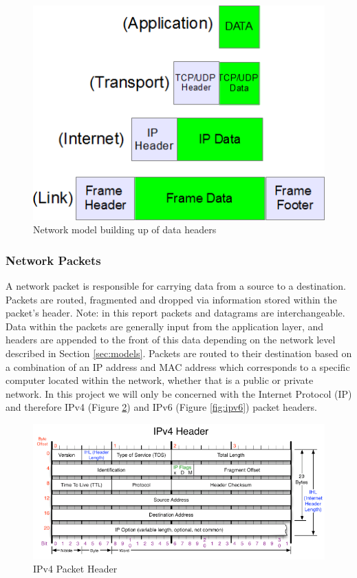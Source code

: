 \documentclass[final_report.tex]{subfiles}
\begin{document}
\begin{figure}[H]
	\centering
	\includegraphics[width=\textwidth]{img/headers.png}
	\caption{Network model building up of data headers}
	\label{fig:headers}
\end{figure}

\subsubsection{Network Packets}
A network packet is responsible for carrying data from a source to a destination. Packets are routed, fragmented and dropped via information stored within the packet's header. Note: in this report packets and datagrams are interchangeable. Data within the packets are generally input from the application layer, and headers are appended to the front of this data depending on the network level described in Section \ref{sec:models}. Packets are routed to their destination based on a combination of an IP address and MAC address which corresponds to a specific computer located within the network, whether that is a public or private network. In this project we will only be concerned with the Internet Protocol (IP) and therefore IPv4 (Figure \ref{fig:ipv4}) and IPv6 (Figure \ref{fig:ipv6}) packet headers.

\begin{figure}[H]
	\centering
	\includegraphics[width=\textwidth]{img/ipv4header.png}
	\caption{IPv4 Packet Header}
	\label{fig:ipv4}
\end{figure}
\end{document}

